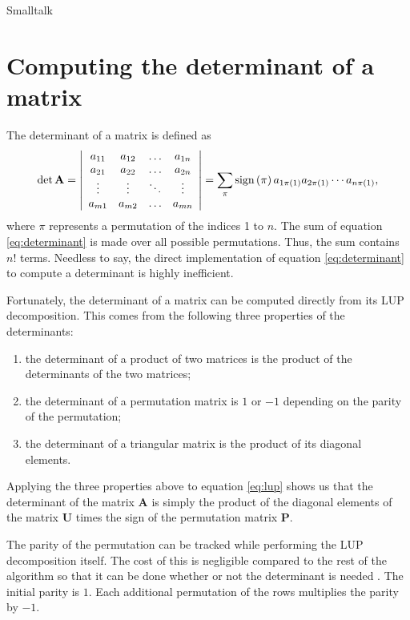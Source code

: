 \begin{displaycode}{Smalltalk}
\section{Computing the determinant of a matrix}
\label{sec:determinant} The determinant of a matrix is defined
as
\begin{equation}
\label{eq:determinant}
  \det\textbf{A}=\left|
  \begin{array}{cccc}a_{11}& a_{12}&\ldots& a_{1n}\\
  a_{21}& a_{22}&\ldots& a_{2n}\\
  \vdots&\vdots&\ddots&\vdots\\
  a_{m1}& a_{m2}&\ldots& a_{mn}\\ \end{array}
  \right|=\sum_{\pi}\mathop{\textrm{sign}}\left({\pi}\right) a_{1\pi\left(1\right)}a_{2\pi\left(1\right)}
  \cdots a_{n\pi\left(1\right)},
\end{equation}
where $\pi$ represents a permutation of the indices 1 to $n$. The
sum of equation \ref{eq:determinant} is made over all possible
permutations. Thus, the sum contains $n!$ terms. Needless to say,
the direct implementation of equation \ref{eq:determinant} to
compute a determinant is highly inefficient.

Fortunately, the determinant of a matrix can be computed directly
from its LUP decomposition. This comes from the following three
properties of the determinants:
\begin{enumerate}
  \item the determinant of a product of two matrices is the product of the determinants of the two
  matrices;
  \item the determinant of a permutation matrix is $1$ or $-1$ depending on the parity of the
  permutation;
  \item the determinant of a triangular matrix is the product of its diagonal elements.
\end{enumerate}
Applying the three properties above to equation \ref{eq:lup} shows
us that the determinant of the matrix $\textbf{A}$ is simply the
product of the diagonal elements of the matrix $\textbf{U}$ times the
sign of the permutation matrix $\textbf{P}$.

The parity of the permutation can be tracked while performing the
LUP decomposition itself. The cost of this is negligible compared
to the rest of the algorithm so that it can be done whether or not
the determinant is needed . The initial parity is $1$. Each
additional permutation of the rows multiplies the parity by $-1$.


\end{displaycode}
